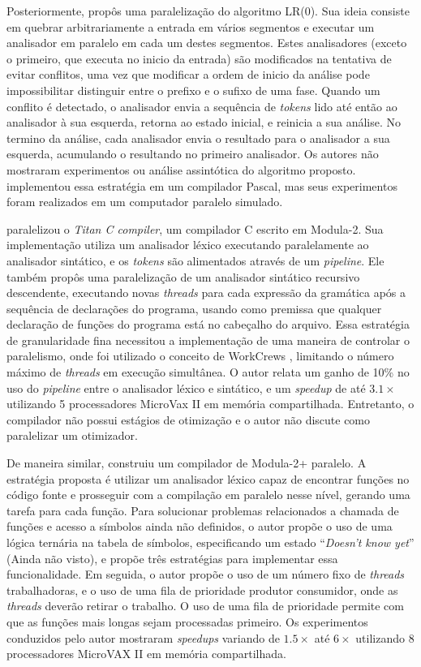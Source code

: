 Posteriormente, \cite{Mickunas:1978:PCM:800127.804105} propôs uma
paralelização do algoritmo LR($0$). Sua ideia consiste em quebrar
arbitrariamente a entrada em vários segmentos e executar um analisador em paralelo
em cada um destes segmentos. Estes analisadores (exceto o primeiro,
que executa no inicio da entrada) são modificados na tentativa de
evitar conflitos, uma vez que modificar a ordem de inicio da análise
pode impossibilitar distinguir entre o prefixo e o sufixo de uma fase.
Quando um conflito é detectado, o analisador envia a sequência de
\textit{tokens} lido até então ao analisador à sua esquerda,
retorna ao estado inicial, e reinicia a sua análise.
No termino da análise, cada analisador envia o resultado para o analisador
a sua esquerda, acumulando o resultando no primeiro analisador.
Os autores não mostraram experimentos ou
análise assintótica do algoritmo proposto. \cite{Pennello:1978:FMA:512760.512786}
implementou essa estratégia em um compilador Pascal, mas seus experimentos foram
realizados em um computador paralelo simulado.

\cite{vandevoorde1988parallel} paralelizou o \textit{Titan C compiler}, um compilador
C escrito em Modula-2. Sua implementação utiliza um analisador léxico executando
paralelamente ao analisador sintático, e os \textit{tokens} são alimentados
através de um \textit{pipeline}. Ele também propôs uma paralelização de um
analisador sintático recursivo descendente, executando novas \textit{threads}
para cada expressão da gramática após a sequência de declarações do programa,
usando como premissa que qualquer declaração de funções do programa está no
cabeçalho do
arquivo. Essa estratégia de granularidade fina necessitou a implementação de
uma maneira de controlar o paralelismo, onde foi utilizado o conceito de
WorkCrews \citep{vandevoorde1988workcrews}, limitando o número máximo de
\textit{threads} em execução simultânea. O autor relata um ganho de 10\% no
uso do \textit{pipeline} entre o analisador léxico e sintático, e um
\textit{speedup} de até $3.1\times$ utilizando 5 processadores MicroVax II em
memória compartilhada.  Entretanto, o compilador não possui estágios de
otimização e o autor não discute como paralelizar um otimizador.

De maneira similar, \cite{wortman1992} construiu um compilador de Modula-2+
paralelo. A estratégia proposta é utilizar um analisador léxico capaz de
encontrar funções no código fonte e prosseguir com a compilação em paralelo
nesse nível, gerando uma tarefa para cada função. Para solucionar problemas
relacionados a chamada de funções e
acesso a símbolos ainda não definidos, o autor propõe o uso de
uma lógica ternária na tabela de símbolos, especificando um estado
``\textit{Doesn't know yet}'' (Ainda não visto), e propõe três estratégias para
implementar essa funcionalidade. Em seguida, o autor propõe o uso de
um número fixo de \textit{threads} trabalhadoras, e o uso de uma fila de
prioridade produtor consumidor, onde as \textit{threads} deverão retirar o trabalho.
O uso de uma fila de prioridade permite com que as funções mais longas sejam
processadas primeiro. Os experimentos conduzidos pelo autor mostraram
\textit{speedups} variando de $1.5\times$ até $6\times$ utilizando 8
processadores MicroVAX II em memória compartilhada.

